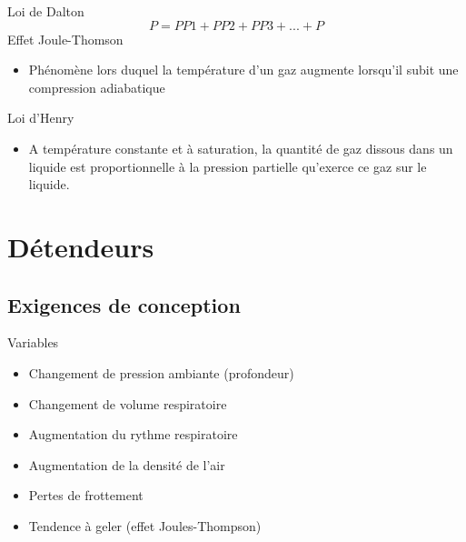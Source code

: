\documentclass[aspectratio=1610,english,12pt]{beamer}
\begin{document}
\begin{frame}{\insertsubsection}
	Loi de Dalton
	\[ P = PP1 + PP2 + PP3 +...+P \]
	Effet Joule-Thomson
	\begin{itemize}
		\item Phénomène lors duquel la température d'un gaz augmente lorsqu'il subit une compression adiabatique
	\end{itemize}
	Loi d'Henry
	\begin{itemize}
		\item A température constante et à saturation, la quantité de gaz dissous dans un liquide est proportionnelle à la pression partielle qu'exerce ce gaz sur le liquide.
	\end{itemize}
\end{frame}


\section{Détendeurs}

\subsection{Exigences de conception}

\begin{frame}{Variables}
	\begin{itemize}
		\item Changement de pression ambiante (profondeur)
		\item Changement de volume respiratoire
		\item Augmentation du rythme respiratoire
		\item Augmentation de la densité de l'air
		\item Pertes de frottement
		\item Tendence à geler (effet Joules-Thompson)
	\end{itemize}
\end{frame}
\end{document}
